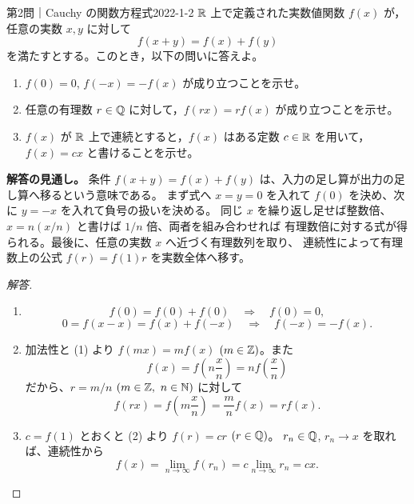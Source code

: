 \begin{problem}{第2問｜Cauchy の関数方程式}{2022-1-2}
$\mathbb{R}$ 上で定義された実数値関数 $f(x)$ が，任意の実数 $x,y$ に対して
\[
f(x+y)=f(x)+f(y)
\]
を満たすとする。このとき，以下の問いに答えよ。
\begin{enumerate}
  \item[(1)] $f(0)=0$, $f(-x)=-f(x)$ が成り立つことを示せ。
  \item[(2)] 任意の有理数 $r\in\mathbb{Q}$ に対して，$f(rx)=rf(x)$ が成り立つことを示せ。
  \item[(3)] $f(x)$ が $\mathbb{R}$ 上で連続とすると，$f(x)$ はある定数 $c\in\mathbb{R}$ を用いて，$f(x)=cx$ と書けることを示せ。
\end{enumerate}
\end{problem}
\begin{memo*}
\textbf{解答の見通し。}
条件 $f(x+y)=f(x)+f(y)$ は、入力の足し算が出力の足し算へ移るという意味である。
まず式へ $x=y=0$ を入れて $f(0)$ を決め、次に $y=-x$ を入れて負号の扱いを決める。
同じ $x$ を繰り返し足せば整数倍、$x=n(x/n)$ と書けば $1/n$ 倍、両者を組み合わせれば
有理数倍に対する式が得られる。最後に、任意の実数 $x$ へ近づく有理数列を取り、
連続性によって有理数上の公式 $f(r)=f(1)r$ を実数全体へ移す。
\end{memo*}
\begin{proof}[解答]
\begin{enumerate}
  \item[(1)]
  \[
  f(0)=f(0)+f(0)\quad\Longrightarrow\quad f(0)=0,
  \]
  \[
  0=f(x-x)=f(x)+f(-x)\quad\Longrightarrow\quad f(-x)=-f(x).
  \]

  \item[(2)] 加法性と (1) より $f(mx)=mf(x)$ $(m\in\mathbb{Z})$。また
  \[
  f(x)=f\left(n\frac{x}{n}\right)=nf\left(\frac{x}{n}\right)
  \]
  だから、$r=m/n$ $(m\in\mathbb{Z},\ n\in\mathbb{N})$ に対して
  \[
  f(rx)=f\left(m\frac{x}{n}\right)=\frac{m}{n}f(x)=rf(x).
  \]

  \item[(3)] $c=f(1)$ とおくと (2) より $f(r)=cr$ $(r\in\mathbb{Q})$。
  $r_n\in\mathbb{Q}$, $r_n\to x$ を取れば、連続性から
  \[
  f(x)=\lim_{n\to\infty}f(r_n)
  =c\lim_{n\to\infty}r_n=cx.
  \]
\end{enumerate}
\end{proof}

